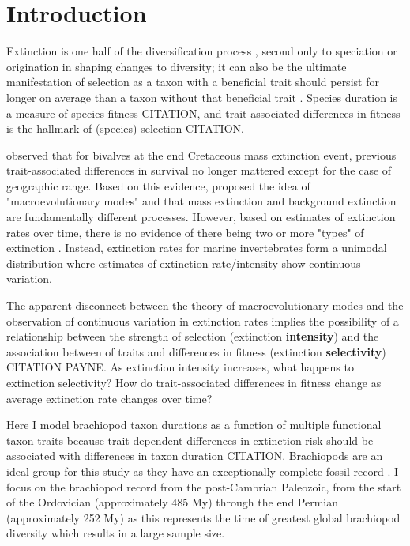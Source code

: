 \documentclass[11pt]{article}
\begin{document}
\newpage{}

\section*{Introduction}

Extinction is one half of the diversification process \citep{Raup1994,Stanley1979,Stanley1975}, second only to speciation or origination in shaping changes to diversity; it can also be the ultimate manifestation of selection as a taxon with a beneficial trait should persist for longer on average than a taxon without that beneficial trait \citep{Rabosky2010b,Jablonski2008a,Raup1994,Stanley1975}. Species duration is a measure of species fitness CITATION, and trait-associated differences in fitness is the hallmark of (species) selection CITATION.

\citet{Jablonski1986} observed that for bivalves at the end Cretaceous mass extinction event, previous trait-associated differences in survival no longer mattered except for the case of geographic range. Based on this evidence, \citet{Jablonski1986} proposed the idea of "macroevolutionary modes" and that mass extinction and background extinction are fundamentally different processes. However, based on estimates of extinction rates over time, there is no evidence of there being two or more "types" of extinction \citep{Wang2003}. Instead, extinction rates for marine invertebrates form a unimodal distribution where estimates of extinction rate/intensity show continuous variation.

The apparent disconnect between the theory of macroevolutionary modes and the observation of continuous variation in extinction rates implies the possibility of a relationship between the strength of selection (extinction \textbf{intensity}) and the association between of traits and differences in fitness (extinction \textbf{selectivity}) CITATION PAYNE. As extinction intensity increases, what happens to extinction selectivity? How do trait-associated differences in fitness change as average extinction rate changes over time?

Here I model brachiopod taxon durations as a function of multiple functional taxon traits because trait-dependent differences in extinction risk should be associated with differences in taxon duration CITATION. Brachiopods are an ideal group for this study as they have an exceptionally complete fossil record \citep{Foote1996e,Foote2000a}. I focus on the brachiopod record from the post-Cambrian Paleozoic, from the start of the Ordovician (approximately 485 My) through the end Permian (approximately 252 My) as this represents the time of greatest global brachiopod diversity \citep{Alroy2010} which results in a large sample size.
\end{document}
